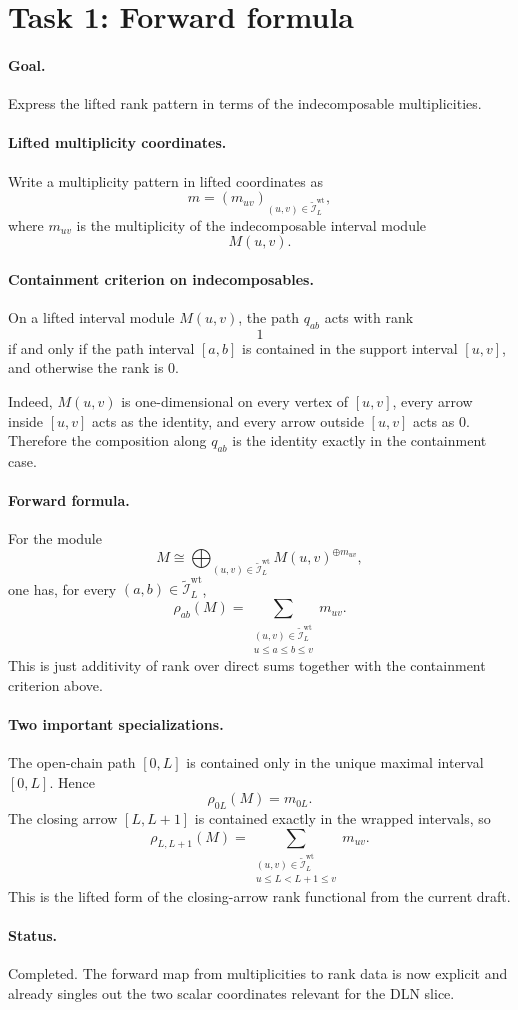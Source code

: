 \section*{Task 1: Forward formula}

\paragraph{Goal.}
Express the lifted rank pattern in terms of the indecomposable multiplicities.

\paragraph{Lifted multiplicity coordinates.}
Write a multiplicity pattern in lifted coordinates as
\[
m=(m_{uv})_{(u,v)\in \widetilde{\mathcal I}_L^{\mathrm{wt}}},
\]
where \(m_{uv}\) is the multiplicity of the indecomposable interval module
\[
M(u,v).
\]

\paragraph{Containment criterion on indecomposables.}
On a lifted interval module \(M(u,v)\), the path \(q_{ab}\) acts with rank
\[
1
\]
if and only if the path interval \([a,b]\) is contained in the support interval
\([u,v]\), and otherwise the rank is \(0\).

Indeed, \(M(u,v)\) is one-dimensional on every vertex of \([u,v]\), every arrow
inside \([u,v]\) acts as the identity, and every arrow outside \([u,v]\) acts
as \(0\). Therefore the composition along \(q_{ab}\) is the identity exactly in
the containment case.

\paragraph{Forward formula.}
For the module
\[
M\cong \bigoplus_{(u,v)\in \widetilde{\mathcal I}_L^{\mathrm{wt}}}
M(u,v)^{\oplus m_{uv}},
\]
one has, for every \((a,b)\in \widetilde{\mathcal I}_L^{\mathrm{wt}}\),
\[
\rho_{ab}(M)
=
\sum_{\substack{(u,v)\in \widetilde{\mathcal I}_L^{\mathrm{wt}}\\
u\le a\le b\le v}}
m_{uv}.
\]
This is just additivity of rank over direct sums together with the containment
criterion above.

\paragraph{Two important specializations.}
The open-chain path \([0,L]\) is contained only in the unique maximal interval
\([0,L]\). Hence
\[
\rho_{0L}(M)=m_{0L}.
\]
The closing arrow \([L,L+1]\) is contained exactly in the wrapped intervals, so
\[
\rho_{L,L+1}(M)
=
\sum_{\substack{(u,v)\in \widetilde{\mathcal I}_L^{\mathrm{wt}}\\
u\le L<L+1\le v}}
m_{uv}.
\]
This is the lifted form of the closing-arrow rank functional from the current
draft.

\paragraph{Status.}
Completed. The forward map from multiplicities to rank data is now explicit and
already singles out the two scalar coordinates relevant for the DLN slice.
